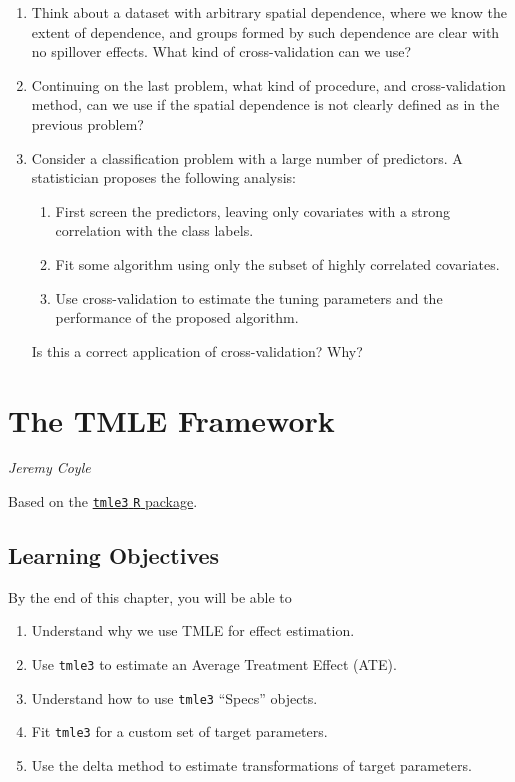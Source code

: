 \documentclass[12pt, krantz2,]{krantz}
\providecommand{\tightlist}{%
  \setlength{\itemsep}{0pt}\setlength{\parskip}{0pt}}
\theoremstyle{definition}
\theoremstyle{definition}
\theoremstyle{definition}
\newcommand{\1}{\mathbbm{1}}
\begin{document}
\begin{enumerate}
\def\labelenumi{\arabic{enumi}.}
\item
  Think about a dataset with arbitrary spatial dependence, where we know
  the extent of dependence, and groups formed by such dependence are clear
  with no spillover effects. What kind of cross-validation can we use?
\item
  Continuing on the last problem, what kind of procedure, and cross-validation
  method, can we use if the spatial dependence is not clearly defined as in the
  previous problem?
\item
  Consider a classification problem with a large number of predictors. A
  statistician proposes the following analysis:

  \begin{enumerate}
  \def\labelenumii{\alph{enumii}.}
  \tightlist
  \item
    First screen the predictors, leaving only covariates with a strong
    correlation with the class labels.
  \item
    Fit some algorithm using only the subset of highly correlated covariates.
  \item
    Use cross-validation to estimate the tuning parameters and the performance
    of the proposed algorithm.
  \end{enumerate}

  Is this a correct application of cross-validation? Why?
\end{enumerate}

\hypertarget{tmle3}{%
\section{The TMLE Framework}\label{tmle3}}

\emph{Jeremy Coyle}

Based on the \href{https://github.com/tlverse/tmle3}{\texttt{tmle3} \texttt{R} package}.

\hypertarget{learn-tmle}{%
\subsection{Learning Objectives}\label{learn-tmle}}

By the end of this chapter, you will be able to

\begin{enumerate}
\def\labelenumi{\arabic{enumi}.}
\tightlist
\item
  Understand why we use TMLE for effect estimation.
\item
  Use \texttt{tmle3} to estimate an Average Treatment Effect (ATE).
\item
  Understand how to use \texttt{tmle3} ``Specs'' objects.
\item
  Fit \texttt{tmle3} for a custom set of target parameters.
\item
  Use the delta method to estimate transformations of target parameters.
\end{enumerate}
\end{document}
